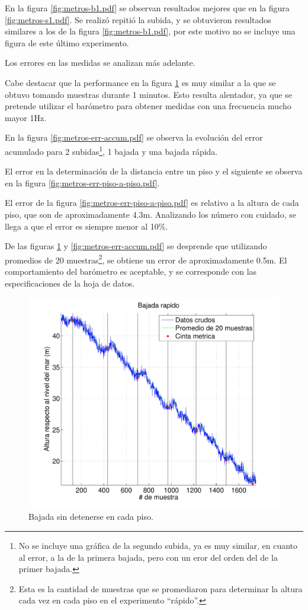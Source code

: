 \documentclass[spanish,12pt,a4paper,titlepage]{report}
\begin{document}
En la figura \ref{fig:metros-b1.pdf} se observan resultados mejores que en la figura \ref{fig:metros-s1.pdf}. Se realizó repitió la subida, y se obtuvieron resultados similares a los de la figura \ref{fig:metros-b1.pdf}, por este motivo no se incluye una figura de este último experimento.

Los errores en las medidas se analizan más adelante.

Cabe destacar que la performance en la figura \ref{fig:metros-rapido.pdf} es muy similar a la que se obtuvo tomando muestras durante 1 minutos. Esto resulta alentador, ya que se pretende utilizar el barómetro para obtener medidas con una frecuencia mucho mayor 1Hz.

En la figura \ref{fig:metros-err-accum.pdf} se observa la evolución del error acumulado para 2 subidas\footnote{No se incluye una gráfica de la segundo subida, ya es muy similar, en cuanto al error, a la de la primera bajada, pero con un eror del orden del de la primer bajada.}, 1 bajada y una bajada rápida.

El error en la determinación de la distancia entre un piso y el siguiente se observa en la figura \ref{fig:metros-err-piso-a-piso.pdf}.

El error de la figura \ref{fig:metros-err-piso-a-piso.pdf} es relativo a la altura de cada piso, que son de aproximadamente 4.3m. Analizando los número con cuidado, se llega a que el error es siempre menor al 10\%.

De las figuras \ref{fig:metros-rapido.pdf} y \ref{fig:metros-err-accum.pdf} se desprende que utilizando promedios de 20 muestras\footnote{Esta es la cantidad de muestras que se promediaron para determinar la altura cada vez en cada piso en el experimento ``rápido''.}, se obtiene un error de aproximadamente 0.5m. El comportamiento del barómetro es aceptable, y se corresponde con las especificaciones de la hoja de datos.


\newpage
\vspace{-40pt}
\begin{figure}[h!]
\centering
  \includegraphics[width=.95\textwidth]{./pics/metros-rapido.pdf}
  \caption{Bajada sin detenerse en cada piso.}
  \label{fig:metros-rapido.pdf}
\end{figure}
\end{document}
